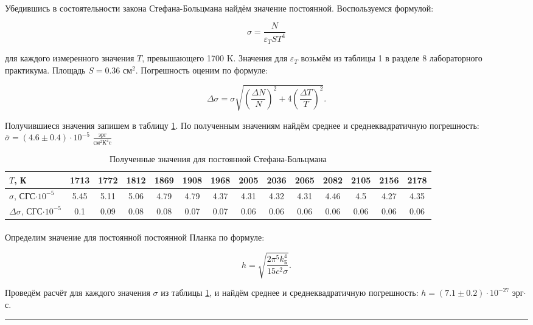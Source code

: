 \documentclass[a4paper,12pt]{article} %
\begin{document}
\paragraph{} Убедившись в состоятельности закона Стефана-Больцмана найдём значение постоянной. Воспользуемся формулой:

\[
\sigma = \frac{N}{\varepsilon_T S T^4}
\]

\noindent для каждого измеренного значения $T$, превышающего 1700 K. Значения для $\varepsilon_T$ возьмём из таблицы 1 в разделе 8 лабораторного практикума. Площадь $S = 0.36$ см$^2$. Погрешность оценим по формуле:

\[
\Delta \sigma = \sigma \sqrt{\left( \frac{\Delta N }{N} \right)^2 + 4\left(  \frac{\Delta T }{T} \right)^2}.
\]

\noindent Получившиеся значения запишем в таблицу \ref{tab:sigma}. По полученным значениям найдём среднее и среднеквадратичную погрешность: $\bar{\sigma} = (4.6 \pm 0.4) \cdot 10^{-5}$ $\frac{\text{эрг}}{\text{см}^2 \text{К}^4 \text{c}}$

\begin{table}[h]
\centering
\scriptsize
\begin{tabular}{|l|c|c|c|c|c|c|c|c|c|c|c|c|c|}
\hline
$T$, К & 1713 & 1772 & 1812 & 1869 & 1908 & 1968 & 2005 & 2036 & 2065 & 2082 & 2105 & 2156 & 2178 \\
\hline
$\sigma$, СГС$\cdot 10^{-5}$ & 5.45 & 5.11 & 5.06 & 4.79 & 4.79 & 4.37 & 4.31 & 4.32 & 4.31 & 4.46 & 4.5 & 4.27 & 4.35 \\
\hline
$\Delta \sigma$, СГС$\cdot 10^{-5}$ & 0.1 & 0.09 & 0.08 & 0.08 & 0.07 & 0.07 & 0.06 & 0.06 & 0.06 & 0.06 & 0.06 & 0.06 & 0.06 \\
\hline
\end{tabular}
\caption{Полученные значения для постоянной Стефана-Больцмана}
\label{tab:sigma}
\end{table}

\paragraph{} Определим значение для постоянной постоянной Планка по формуле:

\[
h = \sqrt{\frac{2 \pi^5 k_\text{Б}^4}{15c^2\sigma}}.
\]

\noindent Проведём расчёт для каждого значения $\sigma$ из таблицы \ref{tab:sigma}, и найдём среднее и среднеквадратичную погрешность: $h = (7.1 \pm 0.2) \cdot 10^{-27}$ эрг$\cdot$с.

\medskip\hrule\medskip
\end{document}

